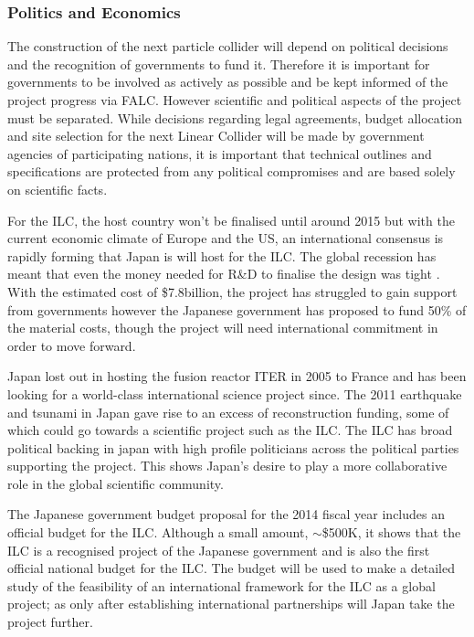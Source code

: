  
\subsubsection{Politics and Economics}

The construction of the next particle collider will depend on political decisions and the recognition of governments to fund it. Therefore it is important for governments to be involved as actively as possible and be kept informed of the project progress via FALC. However scientific and political aspects of the project must be separated. While decisions regarding legal agreements, budget allocation and site selection for the next Linear Collider will be made by government agencies of participating nations, it is important that technical outlines and specifications are protected from any political compromises and are based solely on scientific facts. \cite{ILC:PIPReport}

For the ILC, the host country won’t be finalised until around 2015 but with the current economic climate of Europe and the US, an international consensus is rapidly forming that Japan is will host for the ILC. The global recession has meant that even the money needed for R\&D to finalise the design was tight \cite{Funding:Nature}.  With the estimated cost of \$7.8billion, the project has struggled to gain support from governments however the Japanese government has proposed to fund 50\% of the material costs, though the project will need international commitment in order to move forward.

Japan lost out in hosting the fusion reactor ITER in 2005 to France and has been looking for a world-class international science project since. The 2011 earthquake and tsunami in Japan gave rise to an excess of reconstruction funding, some of which could go towards a scientific project such as the ILC. The ILC has broad political backing in japan with high profile politicians across the political parties supporting the project. This shows Japan's desire to play a more collaborative role in the global scientific community. \cite{Funding:NaturePress1}

The Japanese government budget proposal for the 2014 fiscal year includes an official budget for the ILC. Although a small amount,   $\sim$\$500K, it shows that the ILC is a recognised project of the Japanese government and is also the first official national budget for the ILC. The budget will be used to make a detailed study of the feasibility of an international framework for the ILC as a global project; as only after establishing international partnerships will Japan take the project further. \cite{LCC:Press4}
 
